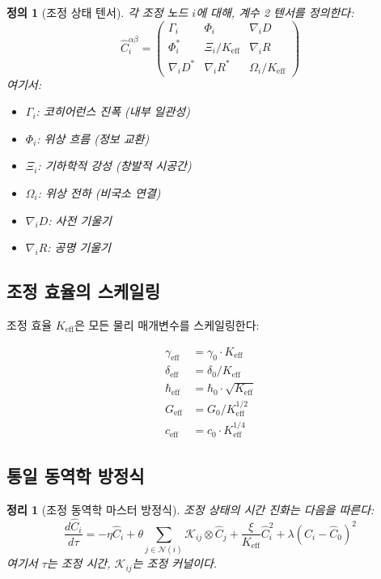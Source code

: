 \documentclass[11pt,a4paper]{article}
\newtheorem{theorem}{정리}
\newtheorem{definition}{정의}
\begin{document}
	\begin{definition}[조정 상태 텐서]
		각 조정 노드 $i$에 대해, 계수 2 텐서를 정의한다:
		\[
		\hat{C}_i^{\alpha\beta} = \begin{pmatrix}
			\Gamma_i & \Phi_i & \nabla_i D \\
			\Phi_i^* & \Xi_i/K_{\mathrm{eff}} & \nabla_i R \\
			\nabla_i D^* & \nabla_i R^* & \Omega_i/K_{\mathrm{eff}}
		\end{pmatrix}
		\]
		여기서:
		\begin{itemize}
			\item $\Gamma_i$: 코히어런스 진폭 (내부 일관성)
			\item $\Phi_i$: 위상 흐름 (정보 교환)
			\item $\Xi_i$: 기하학적 강성 (창발적 시공간)
			\item $\Omega_i$: 위상 전하 (비국소 연결)
			\item $\nabla_i D$: 사전 기울기
			\item $\nabla_i R$: 공명 기울기
		\end{itemize}
	\end{definition}
	
	\subsection{조정 효율의 스케일링}
	
	조정 효율 $K_{\mathrm{eff}}$은 모든 물리 매개변수를 스케일링한다:
	
	\[
	\begin{aligned}
		\gamma_{\mathrm{eff}} &= \gamma_0 \cdot K_{\mathrm{eff}} \\
		\delta_{\mathrm{eff}} &= \delta_0 / K_{\mathrm{eff}} \\
		\hbar_{\mathrm{eff}} &= \hbar_0 \cdot \sqrt{K_{\mathrm{eff}}} \\
		G_{\mathrm{eff}} &= G_0 / K_{\mathrm{eff}}^{1/2} \\
		c_{\mathrm{eff}} &= c_0 \cdot K_{\mathrm{eff}}^{1/4}
	\end{aligned}
	\]
	
	\subsection{통일 동역학 방정식}
	
	\begin{theorem}[조정 동역학 마스터 방정식]
		조정 상태의 시간 진화는 다음을 따른다:
		\[
		\frac{d\hat{C}_i}{d\tau} = -\eta \hat{C}_i + \theta \sum_{j \in \mathcal{N}(i)} \mathcal{K}_{ij} \otimes \hat{C}_j + \frac{\xi}{K_{\mathrm{eff}}} \hat{C}_i^2 + \lambda (\hat{C}_i - \hat{C}_0)^2
		\]
		여기서 $\tau$는 조정 시간, $\mathcal{K}_{ij}$는 조정 커널이다.
	\end{theorem}
	
\end{document}
